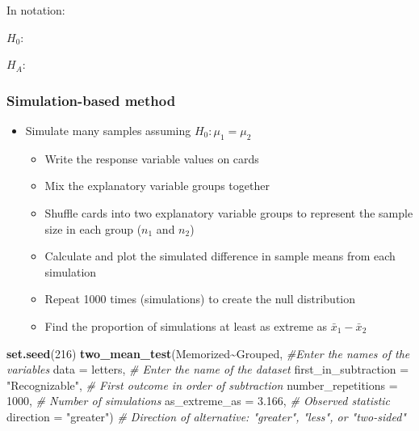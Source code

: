 \documentclass[
]{report}
\newenvironment{Shaded}{\begin{snugshade}}{\end{snugshade}}
\newcommand{\AttributeTok}[1]{\textcolor[rgb]{0.13,0.29,0.53}{#1}}
\newcommand{\CommentTok}[1]{\textcolor[rgb]{0.56,0.35,0.01}{\textit{#1}}}
\newcommand{\DecValTok}[1]{\textcolor[rgb]{0.00,0.00,0.81}{#1}}
\newcommand{\FloatTok}[1]{\textcolor[rgb]{0.00,0.00,0.81}{#1}}
\newcommand{\FunctionTok}[1]{\textcolor[rgb]{0.13,0.29,0.53}{\textbf{#1}}}
\newcommand{\NormalTok}[1]{#1}
\newcommand{\SpecialCharTok}[1]{\textcolor[rgb]{0.81,0.36,0.00}{\textbf{#1}}}
\newcommand{\StringTok}[1]{\textcolor[rgb]{0.31,0.60,0.02}{#1}}
\begin{document}
\vspace{0.5in}

In notation:

\(H_0:\)

\vspace{0.2in}

\(H_A:\)

\vspace{0.2in}

\hypertarget{simulation-based-method-6}{%
\subsubsection*{Simulation-based method}\label{simulation-based-method-6}}

\begin{itemize}
\item
  Simulate many samples assuming \(H_0: \mu_1 = \mu_2\)

  \begin{itemize}
  \item
    Write the response variable values on cards
  \item
    Mix the explanatory variable groups together
  \item
    Shuffle cards into two explanatory variable groups to represent the sample size in each group (\(n_1\) and \(n_2\))
  \item
    Calculate and plot the simulated difference in sample means from each simulation
  \item
    Repeat 1000 times (simulations) to create the null distribution
  \item
    Find the proportion of simulations at least as extreme as \(\bar{x}_1 - \bar{x}_2\)
  \end{itemize}
\end{itemize}

\vspace{1mm}

\begin{Shaded}
\begin{Highlighting}[]
\FunctionTok{set.seed}\NormalTok{(}\DecValTok{216}\NormalTok{)}
\FunctionTok{two\_mean\_test}\NormalTok{(Memorized}\SpecialCharTok{\textasciitilde{}}\NormalTok{Grouped, }\CommentTok{\#Enter the names of the variables}
              \AttributeTok{data =}\NormalTok{ letters,  }\CommentTok{\# Enter the name of the dataset}
              \AttributeTok{first\_in\_subtraction =} \StringTok{"Recognizable"}\NormalTok{, }\CommentTok{\# First outcome in order of subtraction}
              \AttributeTok{number\_repetitions =} \DecValTok{1000}\NormalTok{,  }\CommentTok{\# Number of simulations}
              \AttributeTok{as\_extreme\_as =} \FloatTok{3.166}\NormalTok{,  }\CommentTok{\# Observed statistic}
              \AttributeTok{direction =} \StringTok{"greater"}\NormalTok{)  }\CommentTok{\# Direction of alternative: "greater", "less", or "two{-}sided"}
\end{Highlighting}
\end{Shaded}
\end{document}
